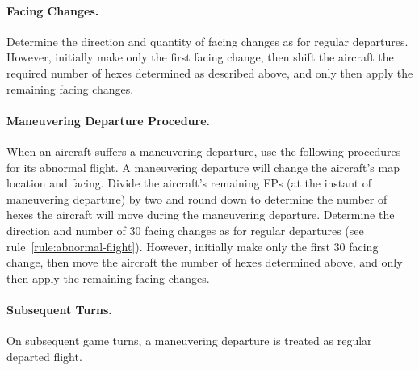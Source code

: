 \begin{advancedrules}
{\paragraph{Facing Changes.} Determine the direction and quantity of facing changes as for regular departures. However, initially make only the first facing change, then shift the aircraft the required number of hexes determined as described above, and only then apply the remaining facing changes.

}{
\paragraph{Maneuvering Departure Procedure.} When an aircraft suffers a maneuvering departure, use the following procedures for its abnormal flight. A maneuvering departure will change the aircraft's map location and facing. Divide the aircraft's remaining FPs (at the instant of maneuvering departure) by two and round down to determine the number of hexes the aircraft will move during the maneuvering departure. Determine the direction and number of 30{\deg} facing changes as for regular departures (see rule~\ref{rule:abnormal-flight}). However, initially make only the first 30{\deg} facing change, then move the aircraft the number of hexes determined above, and only then apply the remaining facing changes.

}


\paragraph{Subsequent Turns.} On subsequent game turns, a maneuvering departure is treated as regular departed flight.

\end{advancedrules}
